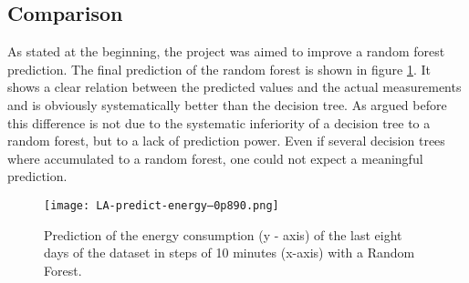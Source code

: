 \documentclass[conference]{IEEEtran}
\begin{document}
\begin{figure*}[!t]
\centerline{
\hfil
{}}
\caption{Analysis of the lowest final MSE of all runs.}
\label{fig:winner}
\end{figure*}


\begin{figure*}[!t]
\centerline{
\hfil
{}}
\caption{Analysis of the lowest prediction MSE of all runs.}
\label{fig:best}
\end{figure*}

\subsection{Comparison}
As stated at the beginning, the project was aimed to improve a random forest prediction. The final prediction of the random forest is shown in figure \ref{fig:random_forest}. It shows a clear relation between the predicted values and the actual measurements and is obviously systematically better than the decision tree. As argued before this difference is not due to the systematic inferiority of a decision tree to a random forest, but to a lack of prediction power. Even if several decision trees where accumulated to a random forest, one could not expect a meaningful prediction.

\begin{figure}[!t] 
\centering 
\texttt{[image: LA-predict-energy--0p890.png]} 
\caption{Prediction of the energy consumption (y - axis) of the last eight days of the dataset in steps of 10 minutes (x-axis) with a Random Forest.} 
\label{fig:random_forest} 
\end{figure}
\end{document}
